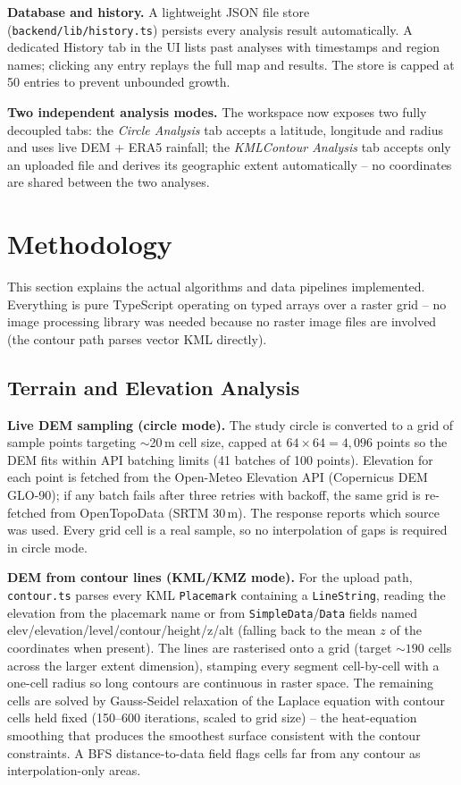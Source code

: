 \documentclass[manuscript,screen,review]{acmart}
\begin{document}
\textbf{Database and history.} A lightweight JSON file store
(\texttt{backend/lib/history.ts}) persists every analysis result
automatically. A dedicated History tab in the UI lists past analyses with
timestamps and region names; clicking any entry replays the full map and
results. The store is capped at 50 entries to prevent unbounded growth.

\textbf{Two independent analysis modes.} The workspace now exposes two fully
decoupled tabs: the \emph{Circle Analysis} tab accepts a latitude, longitude
and radius and uses live DEM + ERA5 rainfall; the \emph{KML\/Contour Analysis}
tab accepts only an uploaded file and derives its geographic extent
automatically -- no coordinates are shared between the two analyses.

\section{Methodology}
\label{sec:methodology}
This section explains the actual algorithms and data pipelines implemented.
Everything is pure TypeScript operating on typed arrays over a raster grid --
no image processing library was needed because no raster image files are
involved (the contour path parses vector KML directly).

\subsection{Terrain and Elevation Analysis}
\textbf{Live DEM sampling (circle mode).} The study circle is converted to a
grid of sample points targeting $\sim$20\,m cell size, capped at
$64\times64 = 4{,}096$ points so the DEM fits within API batching limits
(41 batches of 100 points). Elevation for each point is fetched from the
Open-Meteo Elevation API (Copernicus DEM GLO-90); if any batch fails after
three retries with backoff, the same grid is re-fetched from OpenTopoData
(SRTM 30\,m). The response reports which source was used. Every grid cell is
a real sample, so no interpolation of gaps is required in circle mode.

\textbf{DEM from contour lines (KML/KMZ mode).} For the upload path,
\texttt{contour.ts} parses every KML \texttt{Placemark} containing a
\texttt{LineString}, reading the elevation from the placemark name or from
\texttt{SimpleData}/\texttt{Data} fields named
elev/elevation/level/contour/height/z/alt (falling back to the mean
$z$ of the coordinates when present). The lines are rasterised onto a grid
(target ${\sim}190$ cells across the larger extent dimension), stamping every
segment cell-by-cell with a one-cell radius so long contours are continuous
in raster space. The remaining cells are solved by Gauss-Seidel relaxation of
the Laplace equation with contour cells held fixed (150--600 iterations,
scaled to grid size) -- the heat-equation smoothing that produces the
smoothest surface consistent with the contour constraints. A BFS
distance-to-data field flags cells far from any contour as interpolation-only
areas.
\end{document}
